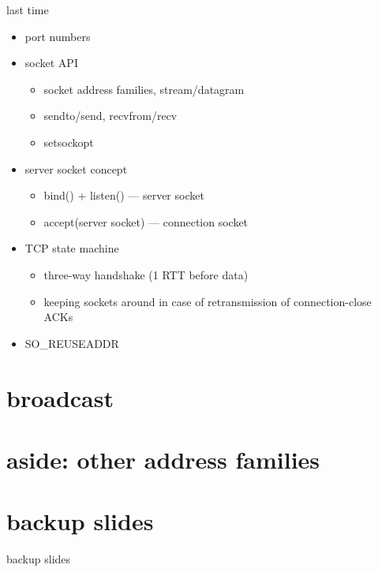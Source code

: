 \date{}
\title{}
\date{}

\begin{frame}
    \titlepage
\end{frame}

\begin{frame}{last time}
    \begin{itemize}
    \item port numbers
    \item socket API
        \begin{itemize}
        \item socket address families, stream/datagram
        \item sendto/send, recvfrom/recv
        \item setsockopt
        \end{itemize}
    \item server socket concept
        \begin{itemize}
        \item bind() + listen() --- server socket
        \item accept(server socket) --- connection socket
        \end{itemize}
    \item TCP state machine
        \begin{itemize}
        \item three-way handshake (1 RTT before data)
        \item keeping sockets around in case of retransmission of connection-close ACKs
        \end{itemize}
    \item SO\_REUSEADDR
    \end{itemize}
\end{frame}

\section{broadcast}


\section{aside: other address families}




\section{backup slides}
\begin{frame}{backup slides}
\end{frame}

